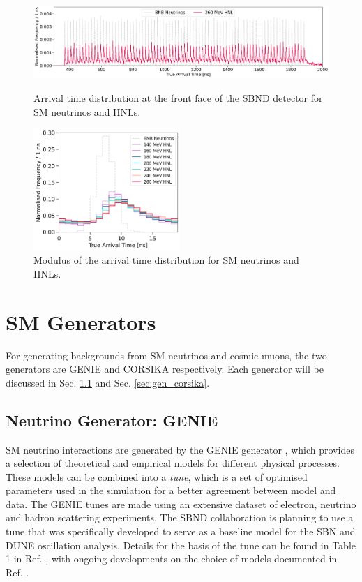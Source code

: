 \begin{figure}[ht!] 
\centering    
\includegraphics[width=1.0\textwidth]{full_beam}
\caption[Arrival Time of SM Neutrinos and HNLs at the Front Face of SBND]{
Arrival time distribution at the front face of the SBND detector for SM neutrinos and HNLs. 
}
\label{fig:full_beam}
\vspace{0.5cm}
\centering    
\includegraphics[width=0.495\textwidth]{beam_modulus}
\caption[Modulus of the Arrival Time Distibutions of SM Neutrinos and HNLs]{
Modulus of the arrival time distribution for SM neutrinos and HNLs. 
}
\label{fig:beam_modulus}
\end{figure}

\newpage
\section{SM Generators}
\label{sec:gen_sm}

For generating backgrounds from SM neutrinos and cosmic muons, the two generators are GENIE \cite{genie} and CORSIKA \cite{corsika} respectively.
Each generator will be discussed in Sec. \ref{sec:gen_genie} and Sec. \ref{sec:gen_corsika}.

\subsection{Neutrino Generator: GENIE}
\label{sec:gen_genie}

SM neutrino interactions are generated by the GENIE generator \cite{genie}, which provides a selection of theoretical and empirical models for different physical processes.
These models can be combined into a \textit{tune}, which is a set of optimised parameters used in the simulation for a better agreement between model and data.
The GENIE tunes are made using an extensive dataset of electron, neutrino and hadron scattering experiments.
The SBND collaboration is planning to use a tune that was specifically developed to serve as a baseline model for the SBN and DUNE oscillation analysis.
Details for the basis of the tune can be found in Table 1 in Ref. \cite{genie_tune}, with ongoing developments on the choice of models documented in Ref. \cite{genie_tune_github}.  

